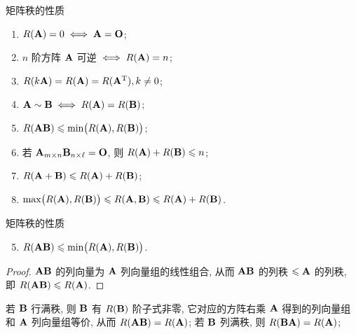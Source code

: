\begin{frame}{矩阵秩的性质}
	\onslide<+->
	\begin{proposition}
		\begin{enumerate}
			\item $R({\mathbf{A}})=0\iff {\mathbf{A}}={\mathbf{O}}$;
			\item $n$ 阶方阵 ${\mathbf{A}}$ 可逆 $\iff R({\mathbf{A}})=n$;
			\item $R(k{\mathbf{A}})=R({\mathbf{A}})=R({\mathbf{A}}^{\mathrm{T}}), k\neq 0$;
			\item ${\mathbf{A}}\sim{\mathbf{B}}\iff R({\mathbf{A}})=R({\mathbf{B}})$;
			\item $R({\mathbf{A}}{\mathbf{B}})\leqslant \min\bigl(R({\mathbf{A}}),R({\mathbf{B}})\bigr)$;
			\item 若 ${\mathbf{A}}_{m\times n}{\mathbf{B}}_{n\times\ell}={\mathbf{O}}$, 则 $R({\mathbf{A}})+R({\mathbf{B}})\leqslant n$;
			\item $R({\mathbf{A}}+{\mathbf{B}})\leqslant R({\mathbf{A}})+R({\mathbf{B}})$;
			\item $\max\bigl(R({\mathbf{A}}),R({\mathbf{B}})\bigr)\leqslant R({\mathbf{A}},{\mathbf{B}})\leqslant R({\mathbf{A}})+R({\mathbf{B}})$.
		\end{enumerate}
	\end{proposition}
\end{frame}


\begin{frame}{矩阵秩的性质}
	\onslide<+->
	\begin{proposition}
		\begin{enumerate}[<*>]
			\setcounter{enumi}{4}
			\item $R({\mathbf{A}}{\mathbf{B}})\leqslant \min\bigl(R({\mathbf{A}}),R({\mathbf{B}})\bigr)$.
		\end{enumerate}
	\end{proposition}
	\onslide<+->
	\begin{proof}
		${\mathbf{A}}{\mathbf{B}}$ 的列向量为 ${\mathbf{A}}$ 列向量组的线性组合, 从而 ${\mathbf{A}}{\mathbf{B}}$ 的列秩 $\leqslant {\mathbf{A}}$ 的列秩, 即 $R({\mathbf{A}}{\mathbf{B}})\leqslant R({\mathbf{A}})$.
		\onslide<+->{%
			于是
			\[R(\bfA\bfB)=R(\bfB^\rmT\bfA^\rmT)\le R(\bfB^\rmT)=R(\bfB).\qedhere\]
		}
		\vspace{-\baselineskip}
	\end{proof}
	\onslide<+->
	若 ${\mathbf{B}}$ 行满秩, 则 ${\mathbf{B}}$ 有 $R({\mathbf{B}})$ 阶子式非零, 它对应的方阵右乘 ${\mathbf{A}}$ 得到的列向量组和 ${\mathbf{A}}$ 列向量组等价, 从而 $R({\mathbf{A}}{\mathbf{B}})=R({\mathbf{A}})$;
	\onslide<+->
	若 ${\mathbf{B}}$ 列满秩, 则 $R({\mathbf{B}}{\mathbf{A}})=R({\mathbf{A}})$;
\end{frame}


